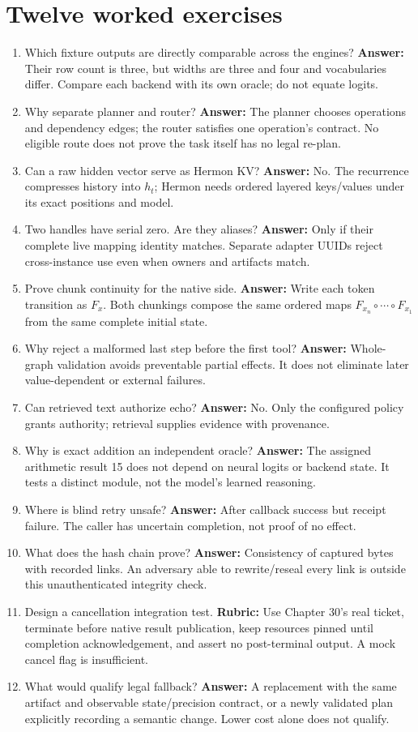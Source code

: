 \section{Twelve worked exercises}
\label{evod39:exercises}
\begin{enumerate}
\item Which fixture outputs are directly comparable across the engines?
\textbf{Answer:} Their row count is three, but widths are three and four and
vocabularies differ. Compare each backend with its own oracle; do not equate logits.
\item Why separate planner and router? \textbf{Answer:} The planner chooses
operations and dependency edges; the router satisfies one operation's contract.
No eligible route does not prove the task itself has no legal re-plan.
\item Can a raw hidden vector serve as Hermon KV? \textbf{Answer:} No.
The recurrence compresses history into $h_t$; Hermon needs ordered layered
keys/values under its exact positions and model.
\item Two handles have serial zero. Are they aliases? \textbf{Answer:} Only
if their complete live mapping identity matches. Separate adapter UUIDs reject
cross-instance use even when owners and artifacts match.
\item Prove chunk continuity for the native side. \textbf{Answer:} Write
each token transition as $F_x$. Both chunkings compose the same ordered maps
$F_{x_n}\circ\cdots\circ F_{x_1}$ from the same complete initial state.
\item Why reject a malformed last step before the first tool?
\textbf{Answer:} Whole-graph validation avoids preventable partial effects.
It does not eliminate later value-dependent or external failures.
\item Can retrieved text authorize echo? \textbf{Answer:} No. Only the
configured policy grants authority; retrieval supplies evidence with provenance.
\item Why is exact addition an independent oracle? \textbf{Answer:} The
assigned arithmetic result 15 does not depend on neural logits or backend state.
It tests a distinct module, not the model's learned reasoning.
\item Where is blind retry unsafe? \textbf{Answer:} After callback success
but receipt failure. The caller has uncertain completion, not proof of no effect.
\item What does the hash chain prove? \textbf{Answer:} Consistency of captured
bytes with recorded links. An adversary able to rewrite/reseal every link
is outside this unauthenticated integrity check.
\item Design a cancellation integration test. \textbf{Rubric:} Use Chapter 30's
real ticket, terminate before native result publication, keep resources pinned
until completion acknowledgement, and assert no post-terminal output. A mock
cancel flag is insufficient.
\item What would qualify legal fallback? \textbf{Answer:} A replacement with
the same artifact and observable state/precision contract, or a newly validated
plan explicitly recording a semantic change. Lower cost alone does not qualify.
\end{enumerate}


